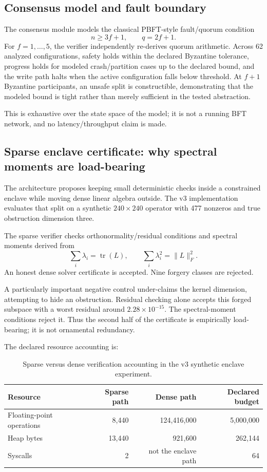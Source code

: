 \documentclass[11pt]{article}
\begin{document}
\subsection{Consensus model and fault boundary}

The consensus module models the classical PBFT-style fault/quorum condition \cite{castro1999pbft}
\[
n\ge3f+1,\qquad q=2f+1.
\]
For \(f=1,\ldots,5\), the verifier independently re-derives quorum arithmetic. Across 62 analyzed configurations, safety holds within the declared Byzantine tolerance, progress holds for modeled crash/partition cases up to the declared bound, and the write path halts when the active configuration falls below threshold. At \(f+1\) Byzantine participants, an unsafe split is constructible, demonstrating that the modeled bound is tight rather than merely sufficient in the tested abstraction.

This is exhaustive over the state space of the model; it is not a running BFT network, and no latency/throughput claim is made.

\subsection{Sparse enclave certificate: why spectral moments are load-bearing}

The architecture proposes keeping small deterministic checks inside a constrained enclave while moving dense linear algebra outside. The v3 implementation evaluates that split on a synthetic \(240\times240\) operator with 477 nonzeros and true obstruction dimension three.

The sparse verifier checks orthonormality/residual conditions and spectral moments derived from
\[
\sum_i\lambda_i=\operatorname{tr}(L),\qquad
\sum_i\lambda_i^2=\|L\|_F^2.
\]
An honest dense solver certificate is accepted. Nine forgery classes are rejected.

A particularly important negative control under-claims the kernel dimension, attempting to hide an obstruction. Residual checking alone accepts this forged subspace with a worst residual around \(2.28\times10^{-15}\). The spectral-moment conditions reject it. Thus the second half of the certificate is empirically load-bearing; it is not ornamental redundancy.

The declared resource accounting is:

\begin{table}[H]
\centering
\caption{Sparse versus dense verification accounting in the v3 synthetic enclave experiment.}
\begin{tabular}{lrrr}
\toprule
Resource & Sparse path & Dense path & Declared budget\\
\midrule
Floating-point operations & 8,440 & 124,416,000 & 5,000,000\\
Heap bytes & 13,440 & 921,600 & 262,144\\
Syscalls & 2 & not the enclave path & 64\\
\bottomrule
\end{tabular}
\end{table}
\end{document}
